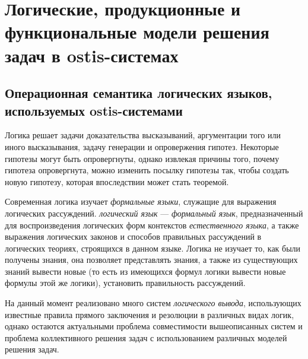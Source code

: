 \chapter{Логические, продукционные и функциональные модели решения задач в ostis-системах}
\label{chapter_logic_productions}

\vspace{-7\baselineskip}

\begin{SCn}
\end{SCn}

\section{Операционная семантика логических языков, используемых ostis-системами}
\label{logic_lang_os}


Логика решает задачи доказательства высказываний, аргументации того или иного высказывания, задачу генерации и опровержения гипотез. Некоторые гипотезы могут быть опровергнуты, однако извлекая причины того, почему гипотеза опровергнута, можно изменить посылку гипотезы так, чтобы создать новую гипотезу, которая впоследствии может стать теоремой.

Современная логика изучает \textit{формальные языки}, служащие для выражения логических рассуждений. \textit{логический язык} — \textit{формальный язык}, предназначенный для воспроизведения логических форм контекстов \textit{естественного языка}, а также выражения логических законов и способов правильных рассуждений в логических теориях, строящихся в данном языке. Логика не изучает то, как были получены знания, она позволяет представлять знания, а также из существующих знаний вывести новые (то есть из имеющихся формул логики вывести новые формулы этой же логики), установить правильность рассуждений.

На данный момент реализовано много систем \textit{логического вывода}, использующих известные правила прямого заключения и резолюции в различных видах логик, однако остаются актуальными проблема совместимости вышеописанных систем и проблема коллективного решения задач с использованием различных моделей решения задач.

